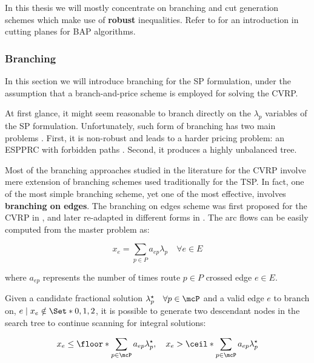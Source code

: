 In this thesis
we will mostly concentrate on branching and cut generation schemes
which make use of \textbf{robust} inequalities.
Refer to \textcite{desaulniers2011} for an introduction in cutting planes for BAP algorithms.


\subsubsection{Branching}
\label{sec:bap-branching}

In this section we will introduce branching for the SP formulation,
under the assumption that a branch-and-price scheme is employed
for solving the CVRP.

At first glance,
it might seem reasonable to branch directly on the $\lambda_p$ variables of the SP formulation.
Unfortunately, such form of branching has two main problems \parencite{vanderbeck2010reformulation}.
First, it is non-robust and leads to a harder pricing problem: an ESPPRC with forbidden paths \parencite{villeneuve2005}.
Second, it produces a highly unbalanced tree.

Most of the branching approaches studied in the literature for the CVRP involve
mere extension of branching schemes used traditionally for the TSP.
In fact, one of the most simple branching scheme,
yet one of the most effective,
involves \textbf{branching on edges}.
The branching on edges scheme was first proposed for the CVRP in \textcite{christofides1969a},
and later re-adapted in different forms in \textcite{fisher1994a, miller1995}.
The arc flows can be easily computed from the master problem as:

\begin{equation}
	x_e = \sum_{p \in P} a_{ep} \lambda_p  \quad \forall e \in E
\end{equation}

where $a_{ep}$ represents the number of times route $p \in P$ crossed edge $e \in E$.

Given a candidate fractional solution $\lambda^\star_p \quad \forall p \in \mcP$
and a valid edge $e$ to branch on, $e \mid x_e \notin \Set*{0, 1, 2}$,
it is possible to generate two descendant nodes in the search tree
to continue scanning for integral solutions:

\begin{equation}\label{eq:sp-branching-on-arcs}
	x_e \le \floor*{\sum_{p \in \mcP} a_{ep} \lambda^\star_p}, \quad
	x_e > \ceil*{\sum_{p \in \mcP} a_{ep} \lambda^\star_p}
\end{equation}


